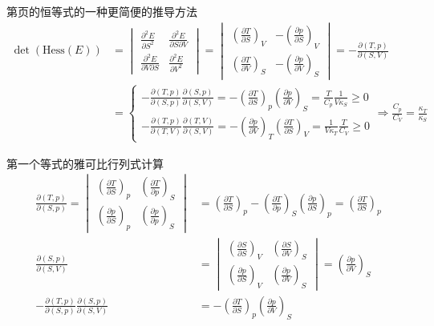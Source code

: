 \begin{example}
    第\pageref{kappa_s}页的恒等式的一种更简便的推导方法
    \begin{align*}
    \det(\text{Hess}(E)) &= 
    \begin{vmatrix}
    \frac{\partial^2 E}{\partial S^2} & \frac{\partial^2 E}{\partial S \partial V} \\
    \frac{\partial^2 E}{\partial V \partial S} & \frac{\partial^2 E}{\partial V^2}
    \end{vmatrix}
    = 
    \begin{vmatrix}
    \left( \frac{\partial T}{\partial S} \right)_V & -\left( \frac{\partial p}{\partial S} \right)_V \\
    \left( \frac{\partial T}{\partial V} \right)_S & -\left( \frac{\partial p}{\partial V} \right)_S
    \end{vmatrix}
    = -\frac{\partial(T,p)}{\partial(S,V)} 
    \\&= 
    \begin{cases}
    -\frac{\partial(T,p)}{\partial(S,p)} \frac{\partial(S,p)}{\partial(S,V)} 
    =- \left( \frac{\partial T}{\partial S} \right)_p 
    \left( \frac{\partial p}{\partial V} \right)_S 
    = \frac{T}{C_p} \frac{1}{V \kappa_S} \geq 0 \\
    -\frac{\partial(T,p)}{\partial(T,V)} \frac{\partial(T,V)}{\partial(S,V)} 
    =- \left( \frac{\partial p}{\partial V} \right)_T 
    \left( \frac{\partial T}{\partial S} \right)_V 
    = \frac{1}{V \kappa_T} \frac{T}{C_V} \geq 0
    \end{cases}
    \Rightarrow 
     \frac{C_p}{C_V} = \frac{\kappa_T}{\kappa_S}
    \end{align*}
    \begin{explain}
    第一个等式的雅可比行列式计算
\begin{align*}
        \frac{\partial(T,p)}{\partial(S,p)} = 
        \begin{vmatrix}
        \left( \frac{\partial T}{\partial S} \right)_p & \left( \frac{\partial T}{\partial p} \right)_S \\
        \left( \frac{\partial p}{\partial S} \right)_p & \left( \frac{\partial p}{\partial p} \right)_S
        \end{vmatrix}
        &= \left( \frac{\partial T}{\partial S} \right)_p - \left( \frac{\partial T}{\partial p} \right)_S \left( \frac{\partial p}{\partial S} \right)_p
        =\left( \frac{\partial T}{\partial S} \right)_p\\
        \frac{\partial(S,p)}{\partial(S,V)} &= 
        \begin{vmatrix}
        \left( \frac{\partial S}{\partial S} \right)_V & \left( \frac{\partial S}{\partial V} \right)_S \\
        \left( \frac{\partial p}{\partial S} \right)_V & \left( \frac{\partial p}{\partial V} \right)_S
        \end{vmatrix}
        = \left( \frac{\partial p}{\partial V} \right)_S
        \\
-\frac{\partial(T,p)}{\partial(S,p)} \frac{\partial(S,p)}{\partial(S,V)} 
&= -\left( \frac{\partial T}{\partial S} \right)_p \left( \frac{\partial p}{\partial V} \right)_S
\end{align*}
    

\end{explain}
\end{example}
